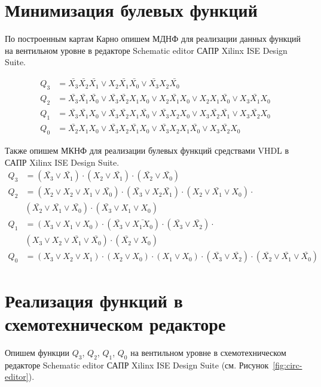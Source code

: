 \section{Минимизация булевых функций}
По построенным картам Карно опишем {МДНФ} для реализации данных функций на вентильном уровне в редакторе Schematic editor САПР Xilinx ISE Design Suite.

\begin{align}
Q_3 &= \bar{X_3}\bar{X_2}\bar{X_1} \vee  X_2 \bar{X_1}\bar{X_0}  \vee \bar{X_3} X_2\bar{X_0} \\
Q_2 &= \bar{X_3} \bar{X_1} \bar{X_0} \vee \bar{X_3} \bar{X_2} X_1 X_0 \vee X_2  \bar{X_1}  X_0 \vee X_2  X_1  \bar{X_0} \vee  X_3  \bar{X_1}  X_0 \\
Q_1 &=  \bar{X_3}\bar{X_1}X_0    \vee  \bar{X_3} \bar{X_2} X_1 \bar{X_0} \vee     \bar{X_3} X_2  X_0  \vee  X_3 \bar{X_2} \bar{X_1}   \vee  X_3 \bar{X_2} X_0 \\
Q_0 &= \bar{X_2} X_1 X_0 \vee \bar{X_3} X_2 \bar{X_1} X_0 \vee \bar{X_3} X_2 X_1 \bar{X_0} \vee X_3 \bar{X_2} X_0
\end{align}

Также опишем {МКНФ} для реализации булевых функций средствами VHDL в САПР Xilinx ISE Design Suite.
\begin{align}
Q_3 &=\left(
\bar{X_3}\vee \bar{X_1}
\right) 
\cdot 
\left(
X_2\vee \bar{X_1}
\right) 
\cdot  
\left(
\bar{X_2}\vee \bar{X_0}
\right) \\
Q_2 &= \left(
X_2 \vee X_2 \vee X_1 \vee \bar{X_0}
\right) 
\cdot 
\left( 
\bar{X_3} \vee X_2 \bar{X_1}
\right) 
\cdot 
\left(
X_2 \vee  \bar{X_1} \vee X_0
\right)
\cdot \\
& \left(
\bar{X_2}  \vee \bar{X_1} \vee \bar{X_0}
\right)
\cdot 
\left(\bar{X_3} \vee X_1 \vee X_0
\right)\\
Q_1 & = \left( X_3 \vee X_1 \vee X_0 \right) \cdot
\left( \bar{X_3} \vee \bar{X_1 X_0} \right) \cdot
\left( \bar{X_3} \vee \bar{X_2} \right) \cdot \\
& \left(X_3 \vee X_2 \vee \bar{X_1} \vee \bar{X_0}\right) \cdot
\left(\bar{X_2} \vee X_0\right)\\
Q_0 & = \left( X_3 \vee X_2 \vee X_1 \right) \cdot
\left(  X_2 \vee X_0 \right) \cdot
\left( X_1 \vee X_0  \right) \cdot
\left( \bar{X_3} \vee \bar{X_2} \right) \cdot
\left( \bar{X_2} \vee \bar{X_1} \vee \bar{X_0} \right)
\end{align}


\section{Реализация функций в схемотехническом редакторе}
Опишем функции $Q_3$,  $Q_2$, $Q_1$,  $Q_0$ на вентильном уровне в схемотехническом редакторе Schematic editor САПР Xilinx ISE Design Suite (см. Рисунок~\ref{fig:circ-editor}).

